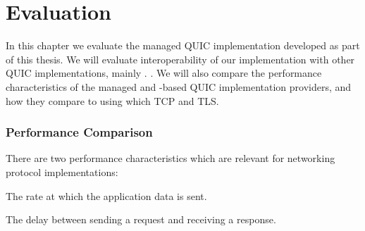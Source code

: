\chapter{Evaluation}

In this chapter we evaluate the managed QUIC implementation developed as part of this thesis. We
will evaluate interoperability of our implementation with other QUIC implementations, mainly
\libmsquic{}. . We will also compare the performance characteristics of the
managed and \libmsquic{}-based QUIC implementation providers, and how they compare to using
 which TCP and TLS.

\subsection{Performance Comparison}

There are two performance characteristics which are relevant for networking protocol implementations:

\begin{itemize}

   The rate at which the application data is sent.

   The delay between sending a request and receiving a response.

\end{itemize}

\subsection{}





